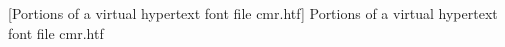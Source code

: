 [Portions of a virtual hypertext font file cmr.htf]{%
 Portions of a virtual hypertext font file cmr.htf
}%
